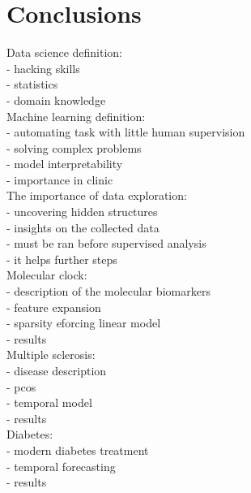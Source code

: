 
\chapter{Conclusions} \label{chap:conclusions}

Data science definition: \\
- hacking skills \\
- statistics \\
- domain knowledge \\

Machine learning definition: \\
- automating task with little human supervision \\
- solving complex problems \\
- model interpretability \\
- importance in clinic \\

The importance of data exploration: \\
- uncovering hidden structures \\
- insights on the collected data \\
- must be ran before supervised analysis \\
- it helps further steps \\

Molecular clock: \\
- description of the molecular biomarkers \\
- feature expansion \\
- sparsity eforcing linear model \\
- results \\

Multiple sclerosis: \\
- disease description \\
- pcos \\
- temporal model \\
- results \\

Diabetes: \\
- modern diabetes treatment \\
- temporal forecasting \\
- results \\



